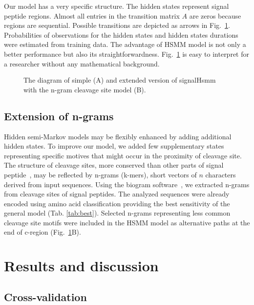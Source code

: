 \documentclass[10pt,letterpaper]{article}
\begin{document}
Our model has a very specific structure. The hidden states represent signal peptide regions.
Almost all entries in the transition matrix $A$ are zeros because regions are sequential.
Possible transitions are depicted as arrows in Fig.~\ref{fig:ngramext}.
Probabilities of observations for the hidden states and hidden states durations were estimated from training data.
The advantage of HSMM model is not only a better performance but also its straightforwardness.
Fig.~\ref{fig:ngramext} is easy to interpret for a researcher without any mathematical background.


\begin{figure}[ht]\centering
\caption{The diagram of simple (A) and extended version of signalHsmm with the n-gram cleavage site model (B).}
\label{fig:ngramext}
\end{figure}

    
\subsection*{Extension of n-grams}

Hidden semi-Markov models may be flexibly enhanced by adding additional hidden states. To improve our model, we added few supplementary states representing specific motives that might occur in the proximity of cleavage site. The structure of cleavage sites, more conserved than other parts of signal peptide~\cite{2004hillerpredisi}, may be reflected by n-grams (k-mers), short vectors of $n$ characters derived from input sequences. Using the biogram software~\cite{biogramPackage}, we extracted n-grams from cleavage sites of signal peptides. The analyzed sequences were already encoded using amino acid classification providing the best sensitivity of the general model (Tab. \ref{tab:best}). Selected n-grams representing less common cleavage site motifs were included in the HSMM model as alternative paths at the end of c-region (Fig.~\ref{fig:ngramext}B).


\section*{Results and discussion}

\subsection*{Cross-validation}
\end{document}
